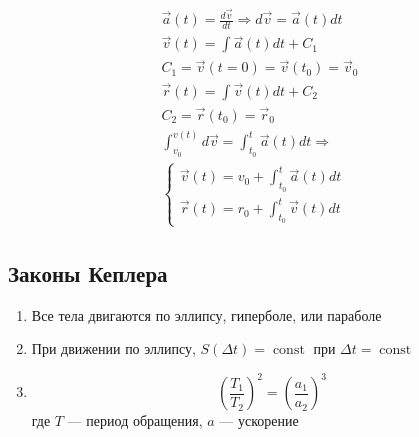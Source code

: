 \documentclass{article}
\DeclareMathOperator*{\const}{const}
\begin{document}
\begin{gather*}
	\vec{a}(t) = \frac{d \vec{v}}{dt} \Rightarrow d \vec{v} = \vec{a}(t) dt \\
	\vec{v}(t) = \int \vec{a}(t) dt + C_1 \\
	C_1 = \vec{v}(t = 0) = \vec{v}(t_0) = \vec{v}_0 \\
	\vec{r}(t) = \int \vec{v}(t)dt + C_2 \\
	C_2 = \vec{r}(t_0) = \vec{r}_0 \\
	\int_{v_0}^{v(t)} d\vec{v} = \int_{t_0}^{t} \vec{a}(t) dt \Rightarrow \\
	\begin{cases}
		\vec{v}(t) = v_0 + \int_{t_0}^{t} \vec{a}(t) dt \\
		\vec{r}(t) = r_0 + \int_{t_0}^{t} \vec{v}(t) dt
	\end{cases}
\end{gather*}

\subsection{Законы Кеплера}

\begin{enumerate}
	\item Все тела двигаются по эллипсу, гиперболе, или параболе
	\item При движении по эллипсу, $S(\Delta t) = \const$ при $\Delta t = \const$
	\item \[ \left( \frac{T_1}{T_2} \right)^2 = \left( \frac{a_1}{a_2} \right)^3 \]
	где $T$ --- период обращения, $a$ --- ускорение
\end{enumerate}
\end{document}
